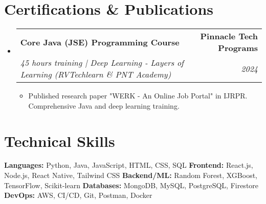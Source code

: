 \documentclass[letterpaper,11pt]{article}
\makeatletter
\newcommand{\resumeItem}[1]{
  \item\small{
    {#1 \vspace{-3pt}}
  }
}
\newcommand{\resumeSubheading}[4]{
  \vspace{-3pt}\item
    \begin{tabular*}{1.0\textwidth}[t]{l@{\extracolsep{\fill}}r}
      \textbf{#1} & \textbf{\small #2} \\
      \textit{\small#3} & \textit{\small #4} \\
    \end{tabular*}\vspace{-8pt}
}
\newcommand{\resumeSubHeadingListStart}{\begin{itemize}[leftmargin=0.0in, label={}]}
\newcommand{\resumeSubHeadingListEnd}{\end{itemize}}
\newcommand{\resumeItemListStart}{\begin{itemize}[itemsep=-2pt]}
\newcommand{\resumeItemListEnd}{\end{itemize}\vspace{-7pt}}
\makeatother
\begin{document}
\section{Certifications \& Publications}
    \resumeSubHeadingListStart
      \resumeSubheading
        {Core Java (JSE) Programming Course}{Pinnacle Tech Programs}
        {45 hours training | Deep Learning - Layers of Learning (RVTechlearn \& PNT Academy)}{2024}
        \resumeItemListStart
          \resumeItem{Published research paper "WERK - An Online Job Portal" in IJRPR. Comprehensive Java and deep learning training.}
        \resumeItemListEnd
    \resumeSubHeadingListEnd

\section{Technical Skills}
\small{
\textbf{Languages:} Python, Java, JavaScript, HTML, CSS, SQL \quad
\textbf{Frontend:} React.js, Node.js, React Native, Tailwind CSS \quad
\textbf{Backend/ML:} Random Forest, XGBoost, TensorFlow, Scikit-learn \quad
\textbf{Databases:} MongoDB, MySQL, PostgreSQL, Firestore \quad
\textbf{DevOps:} AWS, CI/CD, Git, Postman, Docker
}
\vspace{-10pt}
\end{document}
